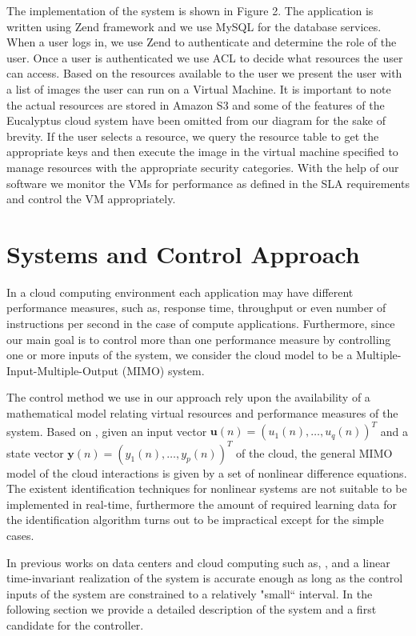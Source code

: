 \documentclass{sig-alternate}
\begin{document}
The implementation of the system is shown in Figure 2.  The application is written using Zend framework and we use MySQL for the database services. When a user logs in, we use Zend to authenticate and determine the role of the user. Once a user is authenticated we use ACL to decide what resources the user can access. Based on the resources available to the user we present the user with a list of images the user can run on a Virtual Machine. It is important to note the actual resources are stored in Amazon S3 and some of the features of the Eucalyptus cloud system have been omitted from our diagram for the sake of brevity.  If the user selects a resource, we query the resource table to get the appropriate keys and then execute the image in the virtual machine specified to manage resources with the appropriate security categories.  With the help of our software we monitor the VMs for performance as defined in the SLA requirements and control the VM appropriately.

\section{Systems and Control Approach}
In a cloud computing environment each application may have different performance measures, such as, response time, 
throughput or even number of instructions per second in the case of compute applications. Furthermore, since our main goal is
to control more than one performance measure by controlling one or more inputs of the system,
we consider the cloud model to be a Multiple-Input-Multiple-Output (MIMO) system.

The control method we use in our approach rely upon the availability of a mathematical model relating virtual resources
and performance measures of the system. Based on \cite{Nathuji-2010}, given an input vector 
$\mathbf{u}(n) = (u_{1}(n),\ldots,u_{q}(n))^{T}$ and a
state vector $\mathbf{y}(n) = (y_{1}(n),\ldots,y_{p}(n))^{T}$ of the cloud, the general MIMO
model of the cloud interactions is given by a set of nonlinear difference equations. The existent identification 
techniques for nonlinear systems are not suitable to be implemented in real-time, furthermore the amount of required
learning data for the identification algorithm turns out to be impractical except for the simple cases.

In previous works on data centers and cloud computing such as, \cite{Nathuji-2010},\cite{Yao-ACC-2010} and \cite{Luna-2011b}
a linear time-invariant realization of the system is accurate enough as long as the control inputs of the system are
constrained to a relatively "small`` interval. In the following section we provide a detailed description of the system
and a first candidate for the controller.
\end{document}
